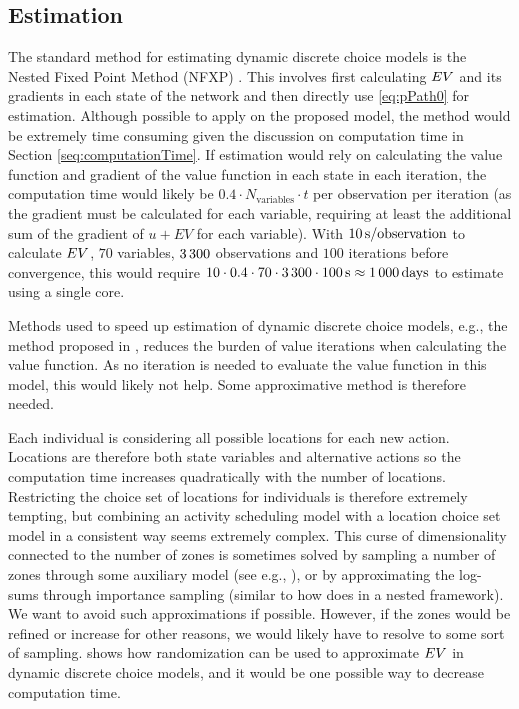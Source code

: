 \subsection{Estimation}
The standard method for estimating dynamic discrete choice models is the Nested Fixed Point Method (NFXP) \citep{RustML88}. This involves first calculating $EV$ and its gradients in each state of the network and then directly use \eqref{eq:pPath0} for estimation. Although possible to apply on the proposed model, the method would be extremely time consuming given the discussion on computation time in Section \ref{seq:computationTime}. If estimation would rely on calculating the value function and gradient of the value function in each state in each iteration, the computation time would likely be $0.4\cdot N_{\text{variables}} \cdot t$ per observation per iteration (as the gradient must be calculated for each variable, requiring at least the additional sum of the gradient of $u + EV$ for each variable). With $10\, \mathrm{s/observation}$ to calculate $EV$, $70$ variables, $3\, 300$ observations and $100$ iterations before convergence, this would require $10 \cdot 0.4 \cdot  70 \cdot 3\, 300 \cdot 100 \, \mathrm{s} \approx 1\, 000 \, \mathrm{days}$ to estimate using a single core. 

Methods used to speed up estimation of dynamic discrete choice models, e.g., the method proposed in \citet{aguirregabiria2002swapping}, reduces the burden of value iterations when calculating the value function. As no iteration is needed to evaluate the value function in this model, this would likely not help. Some approximative method is therefore needed.

Each individual is considering all possible locations for each new action. Locations are therefore both state variables and alternative actions so the computation time increases quadratically with the number of locations. Restricting the choice set of locations for individuals is therefore extremely tempting, but combining an activity scheduling model with a location choice set model in a consistent way seems extremely complex. This curse of dimensionality connected to the number of zones is sometimes solved by sampling a number of zones through some auxiliary model (see e.g., \citep{liao13}), or by approximating the log-sums through importance sampling (similar to how \citealt{Bradley10} does in a nested framework). We want to avoid such approximations if possible. However, if the zones would be refined or increase for other reasons, we would likely have to resolve to some sort of sampling. \citet{Rust97} shows how randomization can be used to approximate $EV$ in dynamic discrete choice models, and it would be one possible way to decrease computation time.

